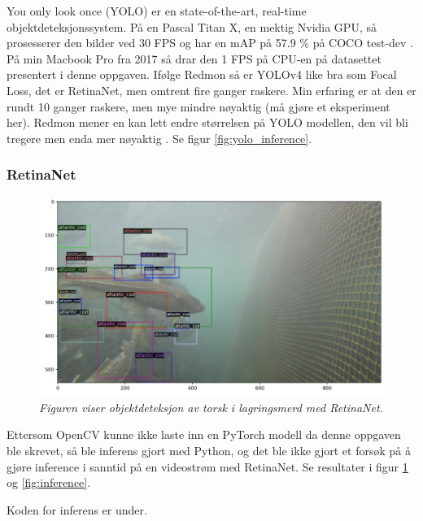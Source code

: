 You only look once (YOLO) er en state-of-the-art, real-time objektdeteksjonssystem. På en Pascal Titan X, en mektig Nvidia GPU, så prosesserer den bilder ved 30 FPS og har en mAP på 57.9 \% på COCO test-dev \cite{Redmon m.fl. 2020}. På min Macbook Pro fra 2017 så drar den 1 FPS på CPU-en på datasettet presentert i denne oppgaven. Ifølge Redmon så er YOLOv4 like bra som Focal Loss, det er RetinaNet, men omtrent fire ganger raskere. Min erfaring er at den er rundt 10 ganger raskere, men mye mindre nøyaktig (må gjøre et eksperiment her). Redmon mener en kan lett endre størrelsen på YOLO modellen, den vil bli tregere men enda mer nøyaktig \cite{Redmon 2020}. Se figur \ref{fig:yolo_inference}.

\subsubsection{RetinaNet}

\begin{figure}
\begin{center} 
\includegraphics[scale=0.35]{figures/retinanet_cod}
\caption{\small \sl Figuren viser objektdeteksjon av torsk i lagringsmerd med RetinaNet. \label{fig:retinenet_inference}} 
\end{center} 
\end{figure} 

Ettersom OpenCV kunne ikke laste inn en PyTorch modell da denne oppgaven ble skrevet, så ble inferens gjort med Python, og det ble ikke gjort et forsøk på å gjøre inference i sanntid på en videostrøm med RetinaNet. Se resultater i figur \ref{fig:retinenet_inference} og \ref{fig:inference}.

Koden for inferens er under.

